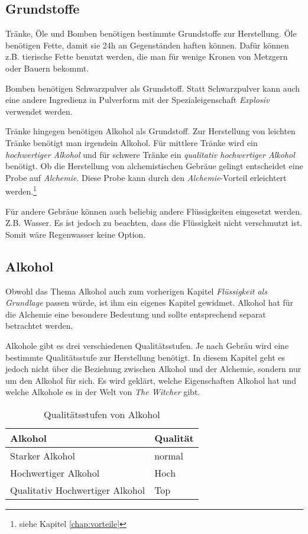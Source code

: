 \subsection{Grundstoffe}
\label{chap:fluessigkeit_als_grundlage}
Tränke, Öle und Bomben benötigen bestimmte Grundstoffe zur Herstellung. Öle benötigen Fette, damit sie 24h an Gegenständen haften können. Dafür können z.B. tierische Fette benutzt werden, die man für wenige Kronen von Metzgern oder Bauern bekommt.

Bomben benötigen Schwarzpulver als Grundstoff. Statt Schwarzpulver kann auch eine andere Ingredienz in Pulverform mit der Spezialeigenschaft \textit{Explosiv} verwendet werden.

Tränke hingegen benötigen Alkohol als Grundstoff. Zur Herstellung von leichten Tränke benötigt man irgendein Alkohol. Für mittlere Tränke wird ein \textit{hochwertiger Alkohol} und für schwere Tränke ein \textit{qualitativ hochwertiger Alkohol} benötigt.  Ob die Herstellung von alchemistischen Gebräue gelingt entscheidet eine Probe auf \textit{Alchemie}. Diese Probe kann durch den \textit{Alchemie}-Vorteil erleichtert werden.\footnote{siehe Kapitel \ref{chap:vorteile}}

Für andere Gebräue können auch beliebig andere Flüssigkeiten eingesetzt werden. Z.B. Wasser. Es ist jedoch zu beachten, dass die Flüssigkeit nicht verschmutzt ist. Somit wäre Regenwasser keine Option. 

\subsection{Alkohol}
Obwohl das Thema Alkohol auch zum vorherigen Kapitel \textit{Flüssigkeit als Grundlage} passen würde, ist ihm ein eigenes Kapitel gewidmet. Alkohol hat für die Alchemie eine besondere Bedeutung und sollte entsprechend separat betrachtet werden.

Alkohole gibt es drei verschiedenen Qualitätsstufen. Je nach Gebräu wird eine bestimmte Qualitätsstufe zur Herstellung benötigt. In diesem Kapitel geht es jedoch nicht über die Beziehung zwischen Alkohol und der Alchemie, sondern nur um den Alkohol für sich. Es wird geklärt, welche Eigenschaften Alkohol hat und welche Alkohole es in der Welt von \textit{The Witcher} gibt.

\begin{table}[h]
\begin{center}
\begin{tabular}{|l|l|}
\hline
\textbf{Alkohol} & \textbf{Qualität} \\ \hline
Starker Alkohol & normal \\ \hline
Hochwertiger Alkohol & Hoch \\ \hline
Qualitativ Hochwertiger Alkohol & Top \\ \hline
\end{tabular}
\end{center}
\caption{Qualitätsstufen von Alkohol}
\label{tab:qualitaetsstufen_von_alkohol}
\end{table}

